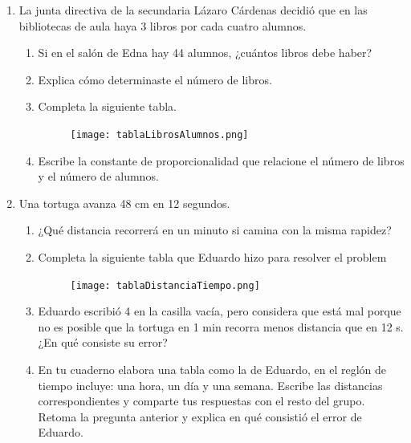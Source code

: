 \documentclass[11pt]{book}
\begin{document}
\begin{enumerate}
  \item La junta directiva de la secundaria Lázaro Cárdenas decidió que en las bibliotecas
        de aula haya 3 libros por cada cuatro alumnos.
        \begin{enumerate}
          \item Si en el salón de Edna hay 44 alumnos, ¿cuántos libros debe haber?
          \item Explica cómo determinaste el número de libros.
          \item Completa la siguiente tabla.
                \begin{figure}[H]
                  \centering
                  \texttt{[image: tablaLibrosAlumnos.png]}
                  \label{fig:tablaLibrosAlumnos}
                \end{figure}
          \item Escribe la constante de proporcionalidad que relacione el número de libros y el
                número de alumnos.
        \end{enumerate}
  \item  Una tortuga avanza 48 cm en 12 segundos.
        \begin{enumerate}
          \item ¿Qué distancia recorrerá en un minuto si camina con la misma rapidez?
          \item Completa la siguiente tabla que Eduardo hizo para resolver el problem
                \begin{figure}[H]
                  \centering
                  \texttt{[image: tablaDistanciaTiempo.png]}
                  \label{fig:tablaDistanciaTiempo}
                \end{figure}
          \item Eduardo escribió 4 en la casilla vacía, pero considera que está mal porque no es
                posible que la tortuga en 1 min recorra menos distancia que en 12 s. ¿En qué
                consiste su error?
          \item En tu cuaderno elabora una tabla como la de Eduardo, en el reglón de tiempo
                incluye: una hora, un día y una semana. Escribe las distancias correspondientes
                y comparte tus respuestas con el resto del grupo. Retoma la pregunta anterior y
                explica en qué consistió el error de Eduardo.
        \end{enumerate}



\end{enumerate}
\end{document}
